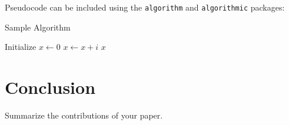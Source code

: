 \documentclass[twoside]{article}
\begin{document}
Pseudocode can be included using the \texttt{algorithm} and \texttt{algorithmic} packages:

\begin{algorithm}
\caption{Sample Algorithm}
\label{alg:example}
\begin{algorithmic}[1]
\STATE Initialize $x \gets 0$
    \STATE $x \gets x + i$
\ENDFOR
\RETURN $x$
\end{algorithmic}
\end{algorithm}

\section{Conclusion}

Summarize the contributions of your paper.



\end{document}
